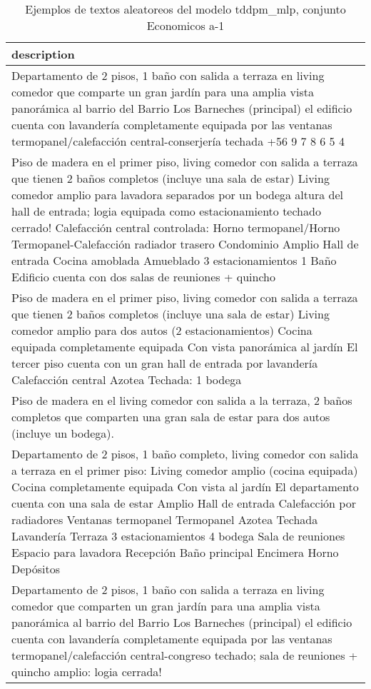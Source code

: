 \begin{table}[H]
\centering
\fontsize{8}{14}\selectfont
\caption{Ejemplos de textos aleatoreos del modelo tddpm\_mlp, conjunto Economicos a-1}
\label{table-sample10-economicos-a-1-tddpm_mlp-text}
\begin{tabular}{|m{50em}|}
\hline
\rowcolor[gray]{0.8}
description \\
\hline Departamento de 2 pisos, 1 baño con salida a terraza en living comedor que comparte un gran jardín para una amplia vista panorámica al barrio del Barrio Los Barneches (principal) el edificio cuenta con lavandería completamente equipada por las ventanas termopanel/calefacción central-conserjería techada +56 9 7 8 6 5 4 \\
\hline Piso de madera en el primer piso, living comedor con salida a terraza que tienen 2 baños completos (incluye una sala de estar) Living comedor amplio para lavadora separados por un bodega altura del hall de entrada; logia equipada como estacionamiento techado cerrado! Calefacción central controlada: Horno termopanel/Horno Termopanel-Calefacción radiador trasero Condominio Amplio Hall de entrada Cocina amoblada Amueblado 3 estacionamientos 1 Baño Edificio cuenta con dos salas de reuniones + quincho \\
\hline Piso de madera en el primer piso, living comedor con salida a terraza que tienen 2 baños completos (incluye una sala de estar) Living comedor amplio para dos autos (2 estacionamientos) Cocina equipada completamente equipada Con vista panorámica al jardín El tercer piso cuenta con un gran hall de entrada por lavandería Calefacción central Azotea Techada: 1 bodega \\
\hline Piso de madera en el living comedor con salida a la terraza, 2 baños completos que comparten una gran sala de estar para dos autos (incluye un bodega). \\
\hline Departamento de 2 pisos, 1 baño completo, living comedor con salida a terraza en el primer piso: Living comedor amplio (cocina equipada) Cocina completamente equipada Con vista al jardín El departamento cuenta con una sala de estar Amplio Hall de entrada Calefacción por radiadores Ventanas termopanel Termopanel Azotea Techada Lavandería Terraza 3 estacionamientos 4 bodega Sala de reuniones Espacio para lavadora Recepción Baño principal Encimera Horno Depósitos \\
\hline Departamento de 2 pisos, 1 baño con salida a terraza en living comedor que comparten un gran jardín para una amplia vista panorámica al barrio del Barrio Los Barneches (principal) el edificio cuenta con lavandería completamente equipada por las ventanas termopanel/calefacción central-congreso techado; sala de reuniones + quincho amplio: logia cerrada! \\

\end{tabular}
\end{table}
